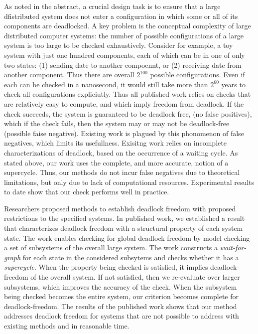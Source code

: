 As noted in the abstract, a crucial design task is to ensure that a large dfistributed system does not enter a configuration in which some or all of
its components are deadlocked. 
A key problem is the conceptual complexity of large distributed computer systems: the number of possible configurations of a large system is 
too large to be checked exhaustively. Consider for example, a toy system with just one hundred components, each of which can be in
one of only two states: (1) sending date to another compoennt, or (2) receiving date from another component. Thus there are overall $2^{100}$ possible
configurations. Even if each can be checked in a nanosecond, it would still take more than $2^{60}$ years to check all configurations expliciutly.
%
Thus all published work relies on checks that are 
relatively easy to compute, and which imply freedom from deadlock. If the check succeeds, the system is guaranteed to be deadlock free, (no false
positives), which if the check fails, then the system may or may not be deadlock-free (possible faise negative).  Existing work is plagued by this
phonomenon of false negatives, which limits its usefullness.
%
Exisitng work relies on incomplete characterizations of deadlock, based on the occurrence of a waiting cycle. 
As stated above, our work uses the complete, and more accurate, notion of a supercycle. Thus, our methods do not incur false negatives due to 
theoretical limitations, but only due to lack of computational resources. Experimental results to date show that our check performs well in practice.



Researchers proposed methods to establish deadlock freedom with proposed restrictions to the specified systems.
%
In published work, we established a result that characterizes deadlock freedom with a structural property of each system state.  The work enables
checking for global deadlock freedom by model checking a set of subsystems of the overall large system.  The work constructs a {\em wait-for-graph}
for each state in the considered subsytems and checks whether it has a {\em supercycle}.
%
When the property being checked is satisfied, it implies deadlock-freedom of the overall system.  If not satisfied, then we re-evaluate over larger
subsystems, which improves the accuracy of the check.  When the subsystem being checked becomes the entire system, our criterion becomes complete for
deadlock-freedom.
%
The results of the published work shows that our method addresses deadlock freedom for systems that are not possible to address with existing methods
and in reasonable time.
%



